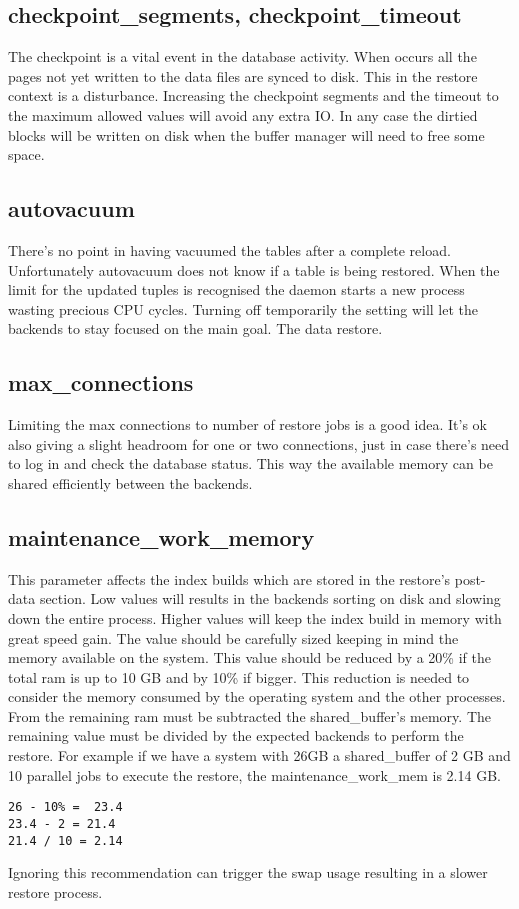\subsection{checkpoint\_segments, checkpoint\_timeout}
The checkpoint is a vital event in the database activity. When occurs all the pages not yet written
to the data files are synced to disk. This in the restore context is a disturbance. Increasing the
checkpoint segments and the timeout to the maximum allowed values will avoid any extra IO. In any
case the dirtied blocks will be written on disk when the buffer manager will need to free some
space.


\subsection{autovacuum}
There's no point in having vacuumed the tables after a complete reload. Unfortunately autovacuum
does not know if a table is being restored. When the limit for the updated tuples is recognised the
daemon starts a new process wasting precious CPU cycles. Turning off temporarily the setting will
let the backends to stay focused on the main goal. The data restore.


\subsection{max\_connections}
Limiting the max connections to number of restore jobs is a good idea. It's ok also giving a slight
headroom for one or two connections, just in case there's need to log in and check the database
status. This way the available memory can be shared efficiently between the backends.

\subsection{maintenance\_work\_memory}
This parameter affects the index builds which are stored in the restore's post-data section. Low 
values will results in the backends sorting on disk and slowing down the entire process. Higher
values will keep the index build in memory with great speed gain. The value should be carefully
sized keeping in mind the memory available on the system. This value should be reduced by a 20\% if
the total ram is up to 10 GB and by 10\% if bigger. This reduction is needed to consider the memory
consumed by the operating system and the other processes. From the remaining ram must be subtracted
the shared\_buffer's memory. The remaining value must be divided by the expected backends to
perform the restore. For example if we have a system with 26GB a shared\_buffer of 2 GB and 10
parallel jobs to execute the restore, the maintenance\_work\_mem is  2.14 GB.
\newpage
\begin{verbatim}
26 - 10% =  23.4
23.4 - 2 = 21.4
21.4 / 10 = 2.14
\end{verbatim}

Ignoring this recommendation can trigger the swap usage resulting in a slower restore process.
